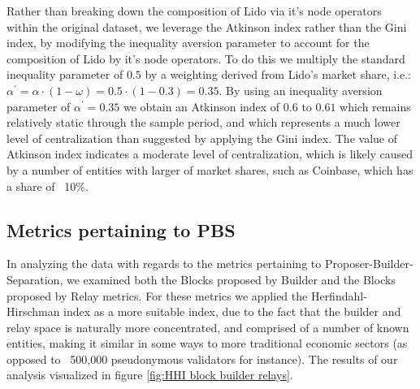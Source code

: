 \documentclass[conference]{IEEEtran}
\begin{document}
Rather than breaking down the composition of Lido via it's node operators within the original dataset, we leverage the Atkinson index rather than the Gini index, by modifying the inequality aversion parameter to account for the composition of Lido by it's node operators.  To do this we multiply the standard inequality parameter of $0.5$ by a weighting derived from Lido's market share, i.e.: $\alpha^\prime = \alpha \cdot \left( 1 - \omega \right) = 0.5 \cdot \left( 1 - 0.3 \right) = 0.35$.  By using an inequality aversion parameter of $\alpha^\prime=0.35$ we obtain an Atkinson index of $0.6$ to $0.61$ which remains relatively static through the sample period, and which represents a much lower level of centralization than suggested by applying the Gini index.  The value of Atkinson index indicates a moderate level of centralization, which is likely caused by a number of entities with larger of market shares, such as Coinbase, which has a share of ~10\%.

\subsection{Metrics pertaining to PBS}

In analyzing the data with regards to the metrics pertaining to Proposer-Builder-Separation, we examined both the Blocks proposed by Builder and the Blocks proposed by Relay metrics.  For these metrics we applied the Herfindahl-Hirschman index as a more suitable index, due to the fact that the builder and relay space is naturally more concentrated, and comprised of a number of known entities, making it similar in some ways to more traditional economic sectors (as opposed to ~500,000 pseudonymous validators for instance).  The results of our analysis visualized in figure \ref{fig:HHI block builder relays}.
\end{document}
